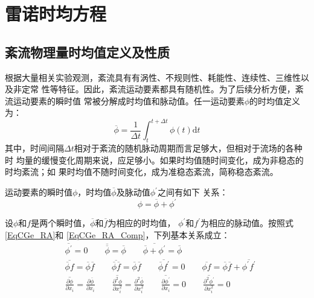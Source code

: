 \section{雷诺时均方程}
\subsection{紊流物理量时均值定义及性质}
根据大量相关实验观测，紊流具有有涡性、不规则性、耗能性、连续性、三维性以及非定常
性等特征。因此，紊流运动要素都具有随机性。为了后续分析方便，紊流运动要素的瞬时值
常被分解成时均值和脉动值。任一运动要素$\phi$的时均值定义为：
\begin{equation}
  \overline{\phi}
  =
  \frac{1}{\Delta t}
  \int_{t}^{t+\Delta t}\!
  \phi(t)
  \mathrm{d}t
  \label{EqCGe_RA}
\end{equation}
其中，时间间隔$\Delta t$相对于紊流的随机脉动周期而言足够大，但相对于流场的各种时
均量的缓慢变化周期来说，应足够小。如果时均值随时间变化，成为非稳态的时均紊流；如
果时均值不随时间变化，成为准稳态紊流，简称稳态紊流。

运动要素的瞬时值$\phi$，时均值$\overline{\phi}$及脉动值$\phi^{\prime}$之间有如下
关系：
\begin{equation}
  \phi = \overline{\phi} + \phi^{\prime}
  \label{EqCGe_RA_Comp}
\end{equation}

设$\phi$和$f$是两个瞬时值，$\overline{\phi}$和$\overline{f}$为相应的时均值，
$\phi^{\prime}$和$f^{\prime}$为相应的脉动值。按照式\eqref{EqCGe_RA}和
\eqref{EqCGe_RA_Comp}，下列基本关系成立：
\begin{equation}
  \begin{aligned}
  &\overline{\phi^{\prime}} = 0
  \quad\quad
  \overline{\overline{\phi}} = \overline{\phi}
  \quad\quad
  \overline{\overline{\phi}+\phi^{\prime}} = \overline{\phi}
  \\
  & \overline{\overline{\phi}f} = \overline{\phi}\overline{f}
  \quad\quad
  \overline{\overline{\phi}\overline{f}} = \overline{\phi}\overline{f}
  \quad\quad
  \overline{\overline{\phi}f^{\prime}} = 0
  \quad\quad
  \overline{\phi f} = \overline{\phi}\overline{f} +
  \overline{\phi^{\prime}f^{\prime}}
  \\
  & \overline{\frac{\partial\phi}{\partial x_{i}}} = \frac{\partial \overline{\phi}}{\partial x_{i}}
  \quad\quad
  \overline{\frac{\partial^{2}\phi}{\partial x_{i}^{2}}} = \frac{\partial^{2}
  \overline{\phi}}{\partial x_{i}^{2}}
  \quad\quad
  \overline{\frac{\partial\phi^{\prime}}{\partial x_{i}}} = 0
  \quad\quad
  \overline{\frac{\partial^{2}\phi^{\prime}}{\partial x_{i}^{2}}} = 0
\end{aligned}
\label{EqCGe_RA_cal}
\end{equation}

